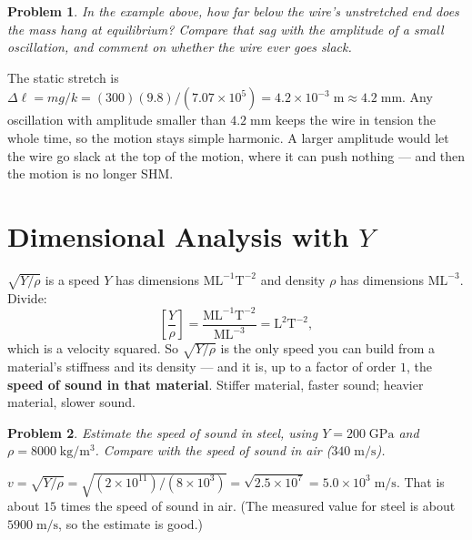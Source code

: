 \documentclass[11pt]{article}
\newcommand{\clearpts}{\addtocounter{tpts}{\value{cpts}} \setcounter{cpts}{0}}
\newcommand{\pts}[1]{\clearpts \setcounter{cpts}{#1}}
\theoremstyle{mystyle}
\newtheorem{pproblem}{Problem}
\begin{document}
\pts{3}
\begin{pproblem}
In the example above, how far below the wire's unstretched end does the mass hang at
equilibrium? Compare that sag with the amplitude of a small oscillation, and comment on
whether the wire ever goes slack.
\end{pproblem}
\begin{solution}
The static stretch is $\Delta \ell = mg/k = (300)(9.8)/(7.07\times 10^5)
= 4.2\times 10^{-3}\;\mathrm{m} \approx 4.2\;\mathrm{mm}$. Any oscillation with amplitude
smaller than $4.2\;\mathrm{mm}$ keeps the wire in tension the whole time, so the motion
stays simple harmonic. A larger amplitude would let the wire go slack at the top of the
motion, where it can push nothing --- and then the motion is no longer SHM.
\end{solution}

\section{Dimensional Analysis with $Y$}

\begin{psidea}{$\sqrt{Y/\rho}$ is a speed}{}
$Y$ has dimensions $\mathrm{M}\mathrm{L}^{-1}\mathrm{T}^{-2}$ and density $\rho$ has dimensions $\mathrm{M}\mathrm{L}^{-3}$. Divide:
\[
\left[\frac{Y}{\rho}\right] = \frac{\mathrm{M}\mathrm{L}^{-1}\mathrm{T}^{-2}}{\mathrm{M}\mathrm{L}^{-3}} = \mathrm{L}^2\mathrm{T}^{-2},
\]
which is a velocity squared. So $\sqrt{Y/\rho}$ is the only speed you can build from a
material's stiffness and its density --- and it is, up to a factor of order $1$, the
\textbf{speed of sound in that material}. Stiffer material, faster sound; heavier
material, slower sound.
\end{psidea}

\pts{3}
\begin{pproblem}
Estimate the speed of sound in steel, using $Y = 200\;\mathrm{GPa}$ and
$\rho = 8000\;\mathrm{kg/m^3}$. Compare with the speed of sound in air
($340\;\mathrm{m/s}$).
\end{pproblem}
\begin{solution}
$v = \sqrt{Y/\rho} = \sqrt{(2\times10^{11})/(8\times10^{3})} = \sqrt{2.5\times 10^{7}}
= 5.0\times 10^{3}\;\mathrm{m/s}$. That is about $15$ times the speed of sound in air.
(The measured value for steel is about $5900\;\mathrm{m/s}$, so the estimate is good.)
\end{solution}
\end{document}
